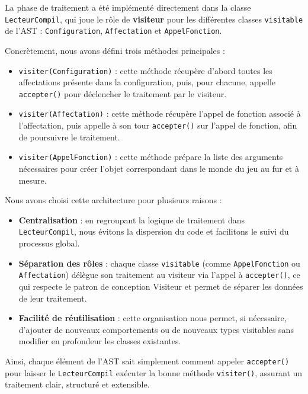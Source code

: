La phase de traitement a été implémenté directement dans la classe \texttt{LecteurCompil}, qui joue le rôle de \textbf{visiteur} pour les différentes classes \texttt{visitable} de l’AST : \texttt{Configuration}, \texttt{Affectation} et \texttt{AppelFonction}.

Concrètement, nous avons défini trois méthodes principales :
\begin{itemize}
    \item \texttt{visiter(Configuration)} : cette méthode récupère d’abord toutes les affectations présente dans la configuration, puis, pour chacune, appelle \texttt{accepter()} pour déclencher le traitement par le visiteur.
    \item \texttt{visiter(Affectation)} : cette méthode récupère l’appel de fonction associé à l’affectation, puis appelle à son tour \texttt{accepter()} sur l’appel de fonction, afin de poursuivre le traitement.
    \item \texttt{visiter(AppelFonction)} : cette méthode prépare la liste des arguments nécessaires pour créer l’objet correspondant dans le monde du jeu au fur et à mesure.
\end{itemize}

Nous avons choisi cette architecture pour plusieurs raisons :
\begin{itemize}
    \item \textbf{Centralisation} : en regroupant la logique de traitement dans \texttt{LecteurCompil}, nous évitons la dispersion du code et facilitons le suivi du processus global.
    \item \textbf{Séparation des rôles} : chaque classe \texttt{visitable} (comme \texttt{AppelFonction} ou \texttt{Affectation}) délègue son traitement au visiteur via l’appel à \texttt{accepter()}, ce qui respecte le patron de conception Visiteur et permet de séparer les données de leur traitement.
    \item \textbf{Facilité de réutilisation} : cette organisation nous permet, si nécessaire, d’ajouter de nouveaux comportements ou de nouveaux types visitables sans modifier en profondeur les classes existantes.
\end{itemize}

Ainsi, chaque élément de l’AST sait simplement comment appeler \texttt{accepter()} pour laisser le \texttt{LecteurCompil} exécuter la bonne méthode \texttt{visiter()}, assurant un traitement clair, structuré et extensible.

